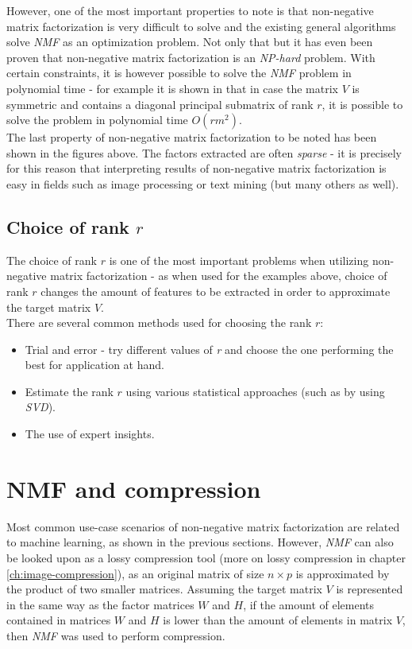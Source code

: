 \documentclass[thesis=M,english]{FITthesis}[2012/10/20]
\begin{document}
However, one of the most important properties to note is that non-negative matrix
factorization is very difficult to solve and the existing general algorithms
solve \emph{NMF} as an optimization problem. Not only that but it has even been
proven that non-negative matrix factorization is an \emph{NP-hard} problem.\cite{nmf-nphard}
With certain constraints, it is however possible to solve the \emph{NMF} problem
in polynomial time - for example it is shown in \cite{nmf-poly} that in case the
matrix $V$ is symmetric and contains a diagonal principal submatrix of rank $r$,
it is possible to solve the problem in polynomial time $O(rm^{2})$.
\\

The last property of non-negative matrix factorization to be noted has been
shown in the figures above. The factors extracted are often \emph{sparse} - it is
precisely for this reason that interpreting results of non-negative matrix
factorization is easy in fields such as image processing or text mining (but many
others as well).\cite{nmf-whyhow}

\subsection{Choice of rank $r$}
The choice of rank $r$ is one of the most important problems when utilizing non-negative
matrix factorization - as when used for the examples above, choice of rank $r$
changes the amount of features to be extracted in order to approximate the target
matrix $V$.
\\


There are several common methods used for choosing the rank $r$:
\begin{itemize}
  \item Trial and error - try different values of \emph{r} and choose the one
        performing the best for application at hand.
  \item Estimate the rank $r$ using various statistical approaches (such as by
        using \emph{SVD}).
  \item The use of expert insights.
\end{itemize}\cite{nmf-whyhow}


\section{NMF and compression}
Most common use-case scenarios of non-negative matrix factorization are
related to machine learning, as shown in the previous sections. However,
\emph{NMF} can also be looked upon as a lossy compression tool (more
on lossy compression in chapter \ref{ch:image-compression}), as an
original matrix of size $n \times p$ is approximated by the product
of two smaller matrices. Assuming the target matrix $V$ is represented
in the same way as the factor matrices $W$ and $H$, if the amount
of elements contained in matrices $W$ and $H$ is lower than the amount of
elements in matrix $V$, then \emph{NMF} was used to perform compression.
\\
\end{document}
